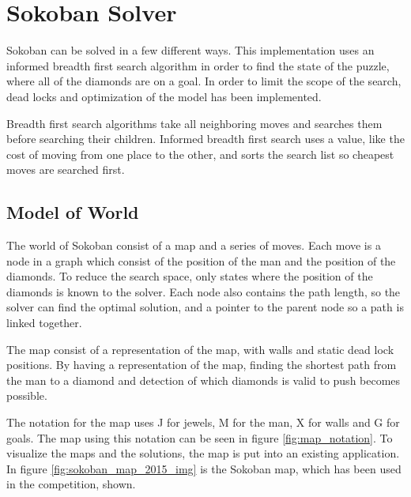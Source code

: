 \section{Sokoban Solver}
Sokoban can be solved in a few different ways. 
This implementation uses an informed breadth first search algorithm in order to find the state of the puzzle, where all of the diamonds are on a goal.
In order to limit the scope of the search, dead locks and optimization of the model has been implemented.

Breadth first search algorithms take all neighboring moves and searches them before searching their children.
Informed breadth first search uses a value, like the cost of moving from one place to the other, and sorts the search list so cheapest moves are searched first.

\subsection{Model of World}
The world of Sokoban consist of a map and a series of moves.
Each move is a node in a graph which consist of the position of the man and the position of the diamonds.
To reduce the search space, only states where the position of the diamonds is known to the solver.
Each node also contains the path length, so the solver can find the optimal solution, and a pointer to the parent node so a path is linked together.

The map consist of a representation of the map, with walls and static dead lock positions.
By having a representation of the map, finding the shortest path from the man to a diamond and detection of which diamonds is valid to push becomes possible.

The notation for the map uses J for jewels, M for the man, X for walls and G for goals.
The map using this notation can be seen in figure \ref{fig:map_notation}.
To visualize the maps and the solutions, the map is put into an existing application\cite{url:qml-sokoban}.
In figure \ref{fig:sokoban_map_2015_img} is the Sokoban map, which has been used in the competition, shown.

